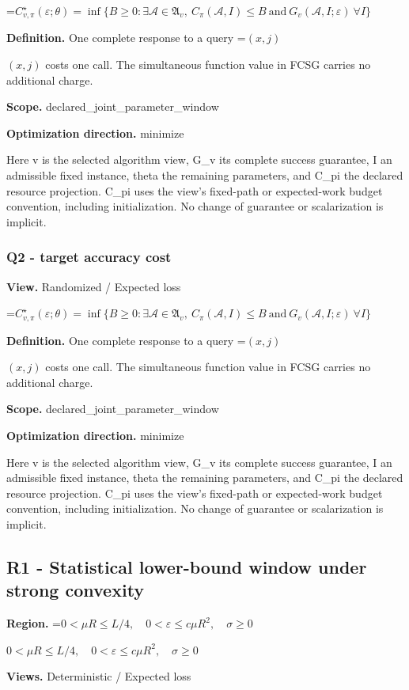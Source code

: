 \documentclass[10pt,a4paper]{article}
\newcommand{\AtlasMath}[1]{\par\begingroup\centering\setbox0=\hbox{$\displaystyle #1$}\ifdim\wd0>1.4\linewidth\typeout{ATLAS WIDE FORMULA: \the\wd0}\fi\ifdim\wd0>\linewidth\resizebox{\linewidth}{!}{\box0}\else\box0\fi\par\endgroup}
\newcommand{\AtlasInlineMath}[1]{\begingroup\setbox0=\hbox{$#1$}\ifdim\wd0>.4\linewidth\endgroup\AtlasMath{#1}\else\endgroup$#1$\fi}
\begin{document}
\AtlasMath{C^\star_{v,\pi}(\varepsilon;\theta)=\inf\{B\ge0:\exists\mathcal A\in\mathfrak A_v,\ C_\pi(\mathcal A,I)\le B\ \text{and}\ G_v(\mathcal A,I;\varepsilon)\ \forall I\}}
\textbf{Definition.} One complete response to a query \AtlasInlineMath{(x,j)} costs one call. The simultaneous function value in FCSG carries no additional charge.

\textbf{Scope.} declared\_joint\_parameter\_window

\textbf{Optimization direction.} minimize

Here v is the selected algorithm view, G\_v its complete success guarantee, I an admissible fixed instance, theta the remaining parameters, and C\_pi the declared resource projection. C\_pi uses the view's fixed-path or expected-work budget convention, including initialization. No change of guarantee or scalarization is implicit.

\subsubsection{Q2 - target accuracy cost}
\textbf{View.} Randomized / Expected loss

\AtlasMath{C^\star_{v,\pi}(\varepsilon;\theta)=\inf\{B\ge0:\exists\mathcal A\in\mathfrak A_v,\ C_\pi(\mathcal A,I)\le B\ \text{and}\ G_v(\mathcal A,I;\varepsilon)\ \forall I\}}
\textbf{Definition.} One complete response to a query \AtlasInlineMath{(x,j)} costs one call. The simultaneous function value in FCSG carries no additional charge.

\textbf{Scope.} declared\_joint\_parameter\_window

\textbf{Optimization direction.} minimize

Here v is the selected algorithm view, G\_v its complete success guarantee, I an admissible fixed instance, theta the remaining parameters, and C\_pi the declared resource projection. C\_pi uses the view's fixed-path or expected-work budget convention, including initialization. No change of guarantee or scalarization is implicit.

\subsection{R1 - Statistical lower-bound window under strong convexity}
\textbf{Region.} \AtlasInlineMath{0<\mu R\le L/4,\quad0<\varepsilon\le c\mu R^2,\quad\sigma\ge0}

\textbf{Views.} Deterministic / Expected loss
\end{document}
